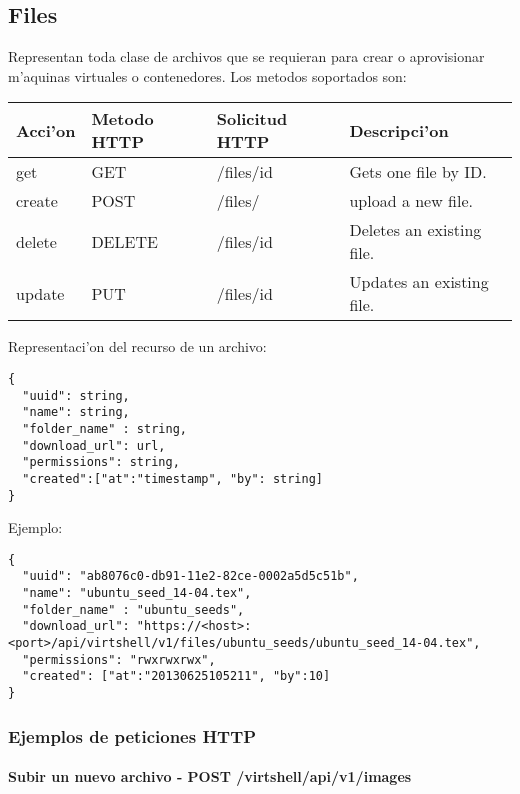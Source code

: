 \subsection{Files}
Representan toda clase de archivos que se requieran para crear o aprovisionar m'aquinas virtuales o contenedores. Los metodos soportados son:

\begin{center}
 \begin{tabular}{| l | l | l | l |}
 \hline
  \rowcolor{blueapi}
  \textbf{Acci'on} & \textbf{Metodo HTTP} & \textbf{Solicitud HTTP} & \textbf{Descripci'on} \\ [0.5ex] 
  \hline\hline
  get & GET & /files/id & Gets one file by ID. \\
  \hline
  create & POST & /files/ & upload a new file. \\
  \hline
  delete & DELETE & /files/id & Deletes an existing file. \\
  \hline  
  update & PUT & /files/id & Updates an existing file. \\ [1ex]  
  \hline
\end{tabular}
\end{center}

\vspace{1cm}
Representaci'on del recurso de un archivo:
\vspace{1cm}

\begin{lstlisting}[style=json]
{
  "uuid": string,
  "name": string,
  "folder_name" : string,
  "download_url": url,
  "permissions": string,
  "created":["at":"timestamp", "by": string]
}
\end{lstlisting}

Ejemplo:

\medskip
\begin{lstlisting}[style=json]
{
  "uuid": "ab8076c0-db91-11e2-82ce-0002a5d5c51b",
  "name": "ubuntu_seed_14-04.tex",
  "folder_name" : "ubuntu_seeds",
  "download_url": "https://<host>:<port>/api/virtshell/v1/files/ubuntu_seeds/ubuntu_seed_14-04.tex",
  "permissions": "rwxrwxrwx",
  "created": ["at":"20130625105211", "by":10]
}
\end{lstlisting}

\subsubsection{Ejemplos de peticiones HTTP}

\paragraph{Subir un nuevo archivo - POST /virtshell/api/v1/images} ~\\

